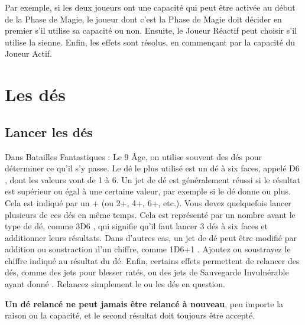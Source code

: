  Par exemple, si les deux joueurs ont une capacité qui peut être activée au début de la Phase de Magie, le joueur dont c'est la Phase de Magie doit décider en premier s'il utilise sa capacité ou non. Ensuite, le Joueur Réactif peut choisir s'il utilise la sienne. Enfin, les effets sont résolus, en commençant par la capacité du Joueur Actif.

\newpage
\section{Les dés}

\subsection{Lancer les dés}

Dans Batailles Fantastiques : Le 9\ieme{} Âge, on utilise souvent des dés pour déterminer ce qu'il s'y passe. Le dé le plus utilisé est un dé à six faces, appelé \og D6 \fg{}, dont les valeurs vont de 1 à 6. Un jet de dé est généralement réussi si le résultat est supérieur ou égal à une certaine valeur, par exemple si le dé donne  ou plus. Cela est indiqué par un + \fg{} (ou 2+, 4+, 6+, etc.). Vous devez quelquefois lancer plusieurs de ces dés en même temps. Cela est représenté par un nombre avant le type de dé, comme \og 3D6 \fg{}, qui signifie qu'il faut lancer 3 dés à six faces et additionner leurs résultats. Dans d'autres cas, un jet de dé peut être modifié par addition ou soustraction d'un chiffre, comme \og 1D6+1 \fg{}. Ajoutez ou soustrayez le chiffre indiqué au résultat du dé. Enfin, certains effets permettent de relancer des dés, comme des jets pour blesser ratés, ou des jets de Sauvegarde Invulnérable ayant donné . Relancez simplement le ou les dés en question.

\textbf{Un dé relancé ne peut jamais être relancé à nouveau}, peu importe la raison ou la capacité, et le second résultat doit toujours être accepté.

